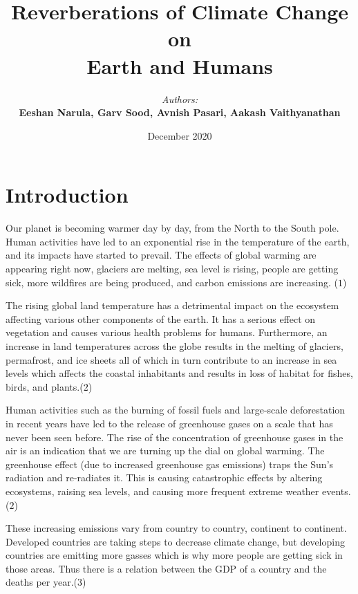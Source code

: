 \documentclass[a4paper, 11pt]{report}
\institute{CSC110 Final Project}
\title{\textbf{Reverberations of Climate Change on \\ Earth and Humans }}
\author{\textit{Authors:}\\\textbf{Eeshan Narula, Garv Sood, Avnish Pasari, Aakash Vaithyanathan}}
\date{December 2020}
\begin{document}
\maketitle
\romantableofcontents

\newpage

\chapter{Introduction}

 {Our planet is becoming warmer day by day, from the North to the South pole. Human activities have led to an exponential rise in the temperature of the earth, and its impacts have started to prevail. The effects of global warming are appearing right now, glaciers are melting, sea level is rising, people are getting sick, more wildfires are being produced, and carbon emissions are increasing}. \scriptsize{($1$)}\\  \normalsize

  { The rising global land temperature has a detrimental impact on the ecosystem affecting various other components of the earth. It has a serious effect on vegetation and causes various health problems for humans. Furthermore, an increase in land temperatures across the globe results in the melting of glaciers, permafrost, and ice sheets all of which in turn contribute to an increase in sea levels which affects the coastal inhabitants and results in loss of habitat for fishes, birds, and plants.}\scriptsize{($2$)} \\ \normalsize

   {Human activities such as the burning of fossil fuels and large-scale deforestation in recent years have led to the release of greenhouse gases on a scale that has never been seen before. The rise of the concentration of greenhouse gases in the air is an indication that we are turning up the dial on global warming. The greenhouse effect (due to increased greenhouse gas emissions) traps the Sun’s radiation and re-radiates it. This is causing catastrophic effects by altering ecosystems, raising sea levels, and causing more frequent extreme weather events}.\scriptsize{($2$)}\\  \normalsize

    {These increasing emissions vary from country to country, continent to continent. Developed countries are taking steps to decrease climate change, but developing countries are emitting more gasses which is why more people are getting sick in those areas. Thus there is a relation between the GDP of a country and the deaths per year}.\scriptsize{($3$)} \normalsize \\
\end{document}
